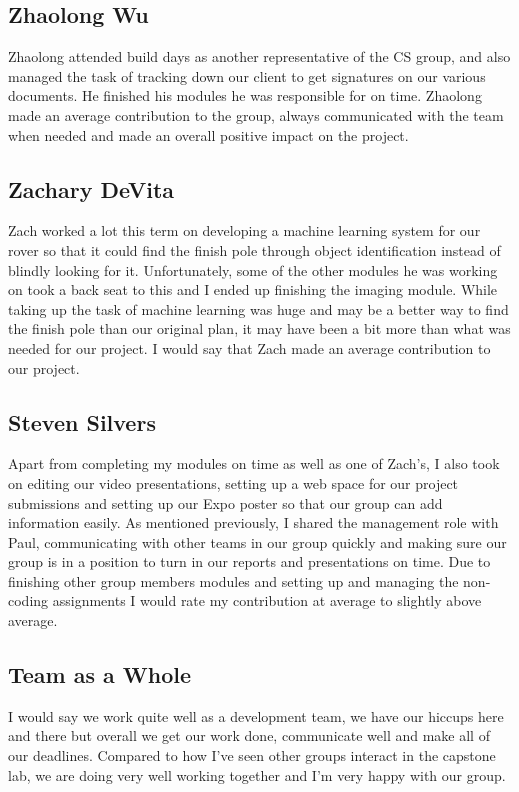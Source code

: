 \documentclass[10pt,letterpaper,onecolumn,draftclsnofoot,journal]{IEEEtran}
\begin{document}
\subsection{Zhaolong Wu}
Zhaolong attended build days as another representative of the CS group, and also managed the task of tracking down our client to get signatures on our various documents. He finished his modules he was responsible for on time. Zhaolong made an average contribution to the group, always communicated with the team when needed and made an overall positive impact on the project.
\subsection{Zachary DeVita}
Zach worked a lot this term on developing a machine learning system for our rover so that it could find the finish pole through object identification instead of blindly looking for it. Unfortunately, some of the other modules he was working on took a back seat to this and I ended up finishing the imaging module. While taking up the task of machine learning was huge and may be a better way to find the finish pole than our original plan, it may have been a bit more than what was needed for our project. I would say that Zach made an average contribution to our project.
\subsection{Steven Silvers}
Apart from completing my modules on time as well as one of Zach's, I also took on editing our video presentations, setting up a web space for our project submissions and setting up our Expo poster so that our group can add information easily. As mentioned previously, I shared the management role with Paul, communicating with other teams in our group quickly and making sure our group is in a position to turn in our reports and presentations on time. Due to finishing other group members modules and setting up and managing the non-coding assignments I would rate my contribution at average to slightly above average.
\subsection{Team as a Whole}
I would say we work quite well as a development team, we have our hiccups here and there but overall we get our work done, communicate well and make all of our deadlines. Compared to how I've seen other groups interact in the capstone lab, we are doing very well working together and I'm very happy with our group.
\end{document}
